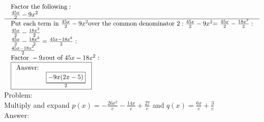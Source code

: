 \documentclass{article}
\begin{document}
$\begin{array}{l}

    \begin{array}{l}
      \text{Factor the following}: \\
      \frac{45 x}{2}-9 x^2         \\
    \end{array}
    \\
    \hline

    \begin{array}{l}
      \text{Put }\text{each }\text{term }\text{in }\frac{45 x}{2}-9 x^2 \text{over }\text{the }\text{common }\text{denominator }2: \frac{45 x}{2}-9 x^2 \text{= }\frac{45 x}{2}-\frac{18 x^2}{2}: \\
      \frac{45 x}{2}-\frac{18 x^2}{2}                                                                                                                                                             \\
    \end{array}
    \\

    \begin{array}{l}
      \frac{45 x}{2}-\frac{18 x^2}{2}=\frac{45 x-18 x^2}{2}: \\
      \frac{45 x-18 x^2}{2}                                  \\
    \end{array}
    \\

    \begin{array}{l}
      \text{Factor }-9 x \text{out }\text{of }45 x-18 x^2: \\
      \fbox{$
          \begin{array}{ll}
            \text{Answer:} &                                 \\
            \text{}        & \frac{\fbox{$-9 x (2 x-5)$}}{2} \\
          \end{array}
      $}                                                   \\
    \end{array}
    \\
  \end{array}
$
\newpage
Problem:\\
Multiply and expand $p(x) = -\frac{26 x^2}{e}-\frac{14 x}{e}+\frac{27}{e}$ and $q(x) = \frac{6 x}{e}+\frac{3}{e}$\\
Answer:\\
\end{document}
